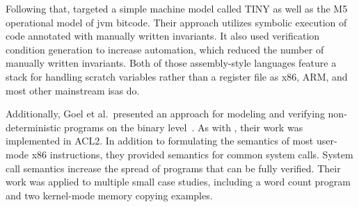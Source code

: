 Following that, \citet{matthews2006verification}
targeted a simple machine model called TINY
as well as the M5 operational model of \ac{jvm} bitcode.
Their approach utilizes symbolic execution of code annotated
with manually written invariants.
It also used verification condition generation to increase automation,
which reduced the number of manually written invariants.
Both of those assembly-style languages feature a stack
for handling scratch variables rather than a register file
as x86, ARM, and most other mainstream \acp{isa} do.

Additionally, Goel et al.\ presented an approach for modeling and verifying
non-deterministic programs on the binary level~\citep{goel2014syscalls,goelphd}.
As with \citet{matthews2006verification}, their work was implemented in ACL2.
In addition to formulating the semantics of most user-mode x86 instructions,
they provided semantics for common system calls.
System call semantics increase the spread of programs that can be fully verified.
Their work was applied to multiple small case studies,
including a word count program and two kernel-mode memory copying examples.

